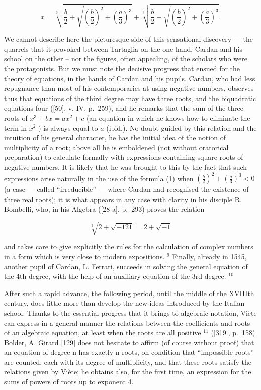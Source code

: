 \[
x = \sqrt [ 3 ]{\frac {b}{2} + \sqrt {\left(\frac {b}{2}\right) ^ {2} + \left(\frac {a}{3}\right) ^ {3}}} + \sqrt [ 3 ]{\frac {b}{2} - \sqrt {\left(\frac {b}{2}\right) ^ {2} + \left(\frac {a}{3}\right) ^ {3}}}.\tag{5.1}
\]

We cannot describe here the picturesque side of this sensational discovery --- the quarrels that it provoked between Tartaglia on the one hand, Cardan and his school on the other -- nor the figures, often appealing, of the scholars who were the protagonists. But we must note the decisive progress that ensued for the theory of equations, in the hands of Cardan and his pupils. Cardan, who had less repugnance than most of his contemporaries at using negative numbers, observes thus that equations of the third degree may have three roots, and the biquadratic equations four ({[}50{]}, v. IV, p.~259), and he remarks that the sum of the three roots of \(x^3 + bx = ax^2 + c\) (an equation in which he knows how to eliminate the term in \(x^2\) ) is always equal to \(a\) (ibid.). No doubt guided by this relation and the intuition of his general character, he has the initial idea of the notion of multiplicity of a root; above all he is emboldened (not without oratorical preparation) to calculate formally with expressions containing square roots of negative numbers. It is likely that he was brought to this by the fact that such expressions arise naturally in the use of the formula (1) when \(\left(\frac{b}{2}\right)^{2}+\left(\frac{a}{3}\right)^{3}<0\) (a case --- called ``irreducible'' --- where Cardan had recognised the existence of three real roots); it is what appears in any case with clarity in his disciple R. Bombelli, who, in his Algebra ({[}28 a{]}, p.~293) proves the relation

\[
\sqrt [ 3 ]{2 + \sqrt {-121}} = 2 + \sqrt {-1}
\]

and takes care to give explicitly the rules for the calculation of complex numbers in a form which is very close to modern expositions. \(^{9}\) Finally, already in 1545, another pupil of Cardan, L. Ferrari, succeeds in solving the general equation of the 4th degree, with the help of an auxiliary equation of the 3rd degree. \(^{10}\)

After such a rapid advance, the following period, until the middle of the XVIIIth century, does little more than develop the new ideas introduced by the Italian school. Thanks to the essential progress that it brings to algebraic notation, Viète can express in a general manner the relations between the coefficients and roots of an algebraic equation, at least when the roots are all positive \(^{11}\) ({[}319{]}, p.~158). Bolder, A. Girard {[}129{]} does not hesitate to affirm (of course without proof) that an equation of degree n has exactly n roots, on condition that ``impossible roots'' are counted, each with its degree of multiplicity, and that these roots satisfy the relations given by Viète; he obtains also, for the first time, an expression for the sums of powers of roots up to exponent 4.

